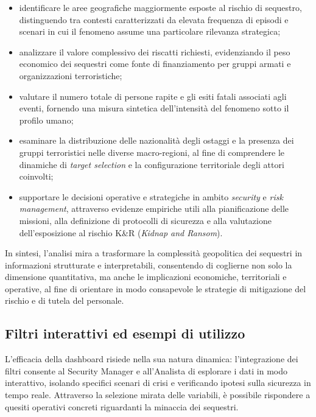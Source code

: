 \begin{itemize}
    \item identificare le aree geografiche maggiormente esposte al rischio di sequestro,
    distinguendo tra contesti caratterizzati da elevata frequenza di episodi e scenari in cui
    il fenomeno assume una particolare rilevanza strategica;

    \item analizzare il valore complessivo dei riscatti richiesti, evidenziando il peso economico
    dei sequestri come fonte di finanziamento per gruppi armati e organizzazioni terroristiche;

    \item valutare il numero totale di persone rapite e gli esiti fatali associati agli eventi,
    fornendo una misura sintetica dell’intensità del fenomeno sotto il profilo umano;

    \item esaminare la distribuzione delle nazionalità degli ostaggi e la presenza dei gruppi
    terroristici nelle diverse macro-regioni, al fine di comprendere le dinamiche di
    \textit{target selection} e la configurazione territoriale degli attori coinvolti;

    \item supportare le decisioni operative e strategiche in ambito \textit{security} e
    \textit{risk management}, attraverso evidenze empiriche utili alla pianificazione
    delle missioni, alla definizione di protocolli di sicurezza e alla valutazione
    dell’esposizione al rischio K\&R (\textit{Kidnap and Ransom}).
\end{itemize}

In sintesi, l’analisi mira a trasformare la complessità geopolitica dei sequestri in informazioni
strutturate e interpretabili, consentendo di coglierne non solo la dimensione quantitativa,
ma anche le implicazioni economiche, territoriali e operative, al fine di orientare in modo
consapevole le strategie di mitigazione del rischio e di tutela del personale.

\subsection{Filtri interattivi ed esempi di utilizzo}

L'efficacia della dashboard risiede nella sua natura dinamica: l'integrazione dei filtri consente al Security Manager e all'Analista di esplorare i dati in modo interattivo, isolando specifici scenari di crisi e verificando ipotesi sulla sicurezza in tempo reale. Attraverso la selezione mirata delle variabili, è possibile rispondere a quesiti operativi concreti riguardanti la minaccia dei sequestri.

